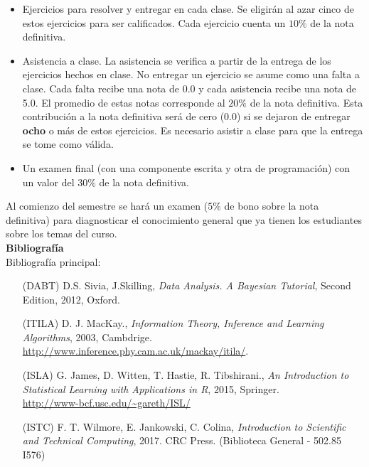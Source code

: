 \documentclass[letterpaper,10pt,onecolumn]{article}
\begin{document}
\begin{itemize}
\item 
Ejercicios para resolver y entregar en cada clase. 
Se eligir\'an al azar cinco de estos ejercicios para ser calificados. 
Cada ejercicio cuenta un $10\%$ de la nota definitiva.

\item
Asistencia a clase. La asistencia se verifica a partir de la entrega de
los ejercicios hechos en clase. 
No entregar un ejercicio se asume como una falta a clase.
Cada falta recibe una nota de 0.0 y cada
asistencia recibe una nota de 5.0. 
El promedio de estas notas corresponde al $20\%$ de la nota
definitiva. 
Esta contribuci\'on a la nota definitiva ser\'a de cero (0.0) si se
dejaron de entregar {\bf ocho} o m\'as de estos ejercicios.
Es necesario asistir a clase para que la entrega se tome como
v\'alida. 
\item
Un examen final (con una componente escrita y otra de
programaci\'on) con un valor del $30\%$ de la nota definitiva.
\end{itemize}

Al comienzo del semestre se har\'a un examen ($5\%$ de bono
sobre la nota definitiva) para diagnosticar el conocimiento general
que ya tienen los estudiantes sobre los temas del curso. 
\\[0.1cm]

\noindent\textbf{\large {} \quad
  Bibliograf\'ia}\\[-0.2cm] 


\noindent\normalsize Bibliograf\'ia principal:

\begin{itemize}
\item [(DABT)] D.S. Sivia, J.Skilling, \textit{Data Analysis. A Bayesian Tutorial}, Second Edition, 2012, Oxford.\\[-0.6cm]
\item [(ITILA)] D. J. MacKay., \textit{Information Theory, Inference and
  Learning Algorithms}, 2003,
  Cambdrige. \\
  \url{http://www.inference.phy.cam.ac.uk/mackay/itila/}.
  \\[-0.6cm]  
\item [(ISLA)] G. James, D. Witten, T. Hastie, R. Tibshirani., \textit{An
  Introduction to Statistical Learning with Applications in R}, 2015,
  Springer. \\
  \url{http://www-bcf.usc.edu/~gareth/ISL/} \\[-0.6cm] 
\item [(ISTC)] F. T. Wilmore, E. Jankowski, C. Colina, \textit{Introduction
  to Scientific and Technical Computing}, 2017. CRC Press. (Biblioteca
  General - 502.85 I576)\\[-0.6cm] 

\end{itemize} 
\end{document}
